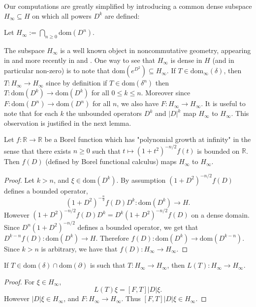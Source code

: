     Our computations are greatly simplified by introducing a common dense subspace $H_\infty \subseteq H$ on which all powers $D^k$
    are defined:
    \begin{defi}\label{H_infty definition}
        Let $H_\infty := \bigcap_{n\geq 0} \mathrm{dom}(D^n)$.
    \end{defi}
    The subspace $H_\infty$ is a well known object in noncommutative geometry, appearing in \cite[Section 1]{Connes-original-spectral-1995} and more recently in \cite[Equation 10.64]{GVF} and \cite[Definition 1.20]{CGRS2}.
    One way to see that $H_\infty$ is dense in $H$ (and in particular non-zero) is to note that $\mathrm{dom}(e^{D^2}) \subseteq H_\infty$.
    If $T \in \mathrm{dom}_\infty(\delta)$, then $T:H_\infty\to H_\infty$ since by definition if $T \in \mathrm{dom}(\delta^n)$ then $T:\mathrm{dom}(D^k)\to\mathrm{dom}(D^k)$ for all $0 \leq k \leq n$. Moreover since $F:\mathrm{dom}(D^n)\to \mathrm{dom}(D^n)$ for all $n$, we also
    have $F:H_\infty\to H_\infty$. It is useful to note that for each $k$ the unbounded operators $D^k$ and $|D|^k$ map $H_\infty$ to $H_\infty$. This observation is justified in the next lemma.
    
    \begin{lem}
        Let $f:\mathbb{R}\to \mathbb{R}$ be a Borel function which has "polynomial growth at infinity" in the sense that there exists $n \geq 0$ such that
        $t\mapsto (1+t^2)^{-n/2}f(t)$ is bounded on $\mathbb{R}$. Then $f(D)$ (defined by Borel functional calculus) maps $H_\infty$ to $H_\infty$.
    \end{lem}
    \begin{proof}
        Let $k > n$, and $\xi \in \mathrm{dom}(D^k)$. By assumption $(1+D^2)^{-n/2}f(D)$ defines a bounded operator,
        \begin{equation*}
            (1+D^2)^{-\frac{n}{2}}f(D)D^k:\mathrm{dom}(D^k)\to H.
        \end{equation*}
        However $(1+D^2)^{-n/2}f(D)D^k = D^k(1+D^2)^{-n/2}f(D)$ on a dense domain. Since $D^n(1+D^2)^{-n/2}$ defines a bounded operator, we get that $D^{k-n}f(D):\mathrm{dom}(D^k)\to H$. Therefore
        $f(D):\mathrm{dom}(D^k)\to \mathrm{dom}(D^{k-n})$. Since $k > n$ is arbitrary, we have that $f(D):H_\infty\to H_\infty$.
    \end{proof}
    
    \begin{lem}
        If $T \in \mathrm{dom}(\delta)\cap \mathrm{dom}(\partial)$ is such that $T:H_\infty\to H_\infty$, then $L(T):H_\infty \to H_\infty$.
    \end{lem}
    \begin{proof}
        For $\xi \in H_\infty$,
        \begin{equation*}
            L(T)\xi = [F,T]|D|\xi.
        \end{equation*}
        However $|D|\xi \in H_\infty$, and $F:H_\infty\to H_\infty$. Thus $[F,T]|D|\xi \in H_\infty$.
    \end{proof}
    
